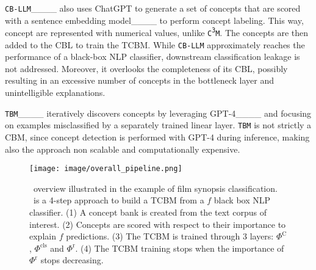 \texttt{CB-LLM}____ also uses ChatGPT to generate a set of concepts that are scored with a sentence embedding model____ to perform concept labeling. This way, concept are represented with numerical values, unlike \texttt{C\textsuperscript{3}M}. The concepts are then added to the CBL to train the TCBM. While \texttt{CB-LLM} approximately reaches the performance of a black-box NLP classifier, downstream classification leakage is not addressed. Moreover, it overlooks the completeness of its CBL, possibly resulting in an excessive number of concepts in the bottleneck layer and unintelligible explanations.

\texttt{TBM}____ iteratively discovers concepts by leveraging GPT-4____ and focusing on examples misclassified by a separately trained linear layer. \texttt{TBM} is not strictly a CBM, since concept detection is performed with GPT-4 during inference, making also the approach non scalable and computationally expensive.


\begin{figure*}[t]{\centering}
\begin{center}
\texttt{[image: image/overall\_pipeline.png]}
\caption{\method\ overview illustrated in the example of film synopsis classification. \method\ is a 4-step approach to build a TCBM from a $f$ black box NLP classifier. (1) A concept bank is created from the text corpus of interest. (2) Concepts are scored with respect to their importance to explain $f$ predictions. (3) The TCBM is trained through 3 layers: $\Phi^{\text{C}}$, $\Phi^{\text{cls}}$ and $\Phi^{\text{r}}$. (4) The TCBM training stops when the importance of $\Phi^{\text{r}}$ stops decreasing.}  
\label{fig:global_flow}
\end{center}
\end{figure*}